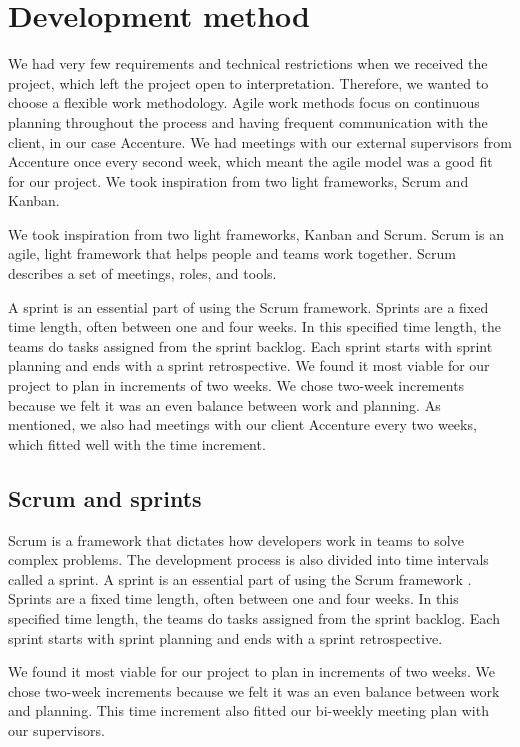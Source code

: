 \section{Development method}
We had very few requirements and technical restrictions when we received the project, which left the project open to interpretation. Therefore, we wanted to choose a flexible work methodology. Agile work methods focus on continuous planning throughout the process and having frequent communication with the client, in our case Accenture. We had meetings with our external supervisors from Accenture once every second week, which meant the agile model was a good fit for our project. We took inspiration from two light frameworks, Scrum and Kanban.

We took inspiration from two light frameworks, Kanban and Scrum. Scrum is an agile,  light framework that helps people and teams work together. Scrum describes a set of meetings, roles, and tools. 

A sprint is an essential part of using the Scrum framework. Sprints are a fixed time length, often between one and four weeks. In this specified time length, the teams do tasks assigned from the sprint backlog. Each sprint starts with sprint planning and ends with a sprint retrospective. We found it most viable for our project to plan in increments of two weeks. We chose two-week increments because we felt it was an even balance between work and planning. As mentioned, we also had meetings with our client Accenture every two weeks, which fitted well with the time increment.   

\subsection{Scrum and sprints}
Scrum is a framework that dictates how developers work in teams to solve complex problems. The development process is also divided into time intervals called a sprint. A sprint is an essential part of using the Scrum framework \parencite{prosjektveilederen}. Sprints are a fixed time length, often between one and four weeks. In this specified time length, the teams do tasks assigned from the sprint backlog. Each sprint starts with sprint planning and ends with a sprint retrospective.

We found it most viable for our project to plan in increments of two weeks. We chose two-week increments because we felt it was an even balance between work and planning. This time increment also fitted our bi-weekly meeting plan with our supervisors.

